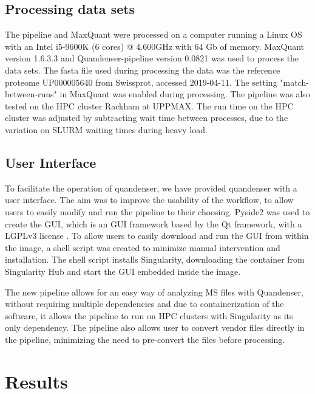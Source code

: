\documentclass[11pt]{article}
\begin{document}
\subsection*{Processing data sets}
The pipeline and MaxQuant were processed on a computer running a Linux OS with an Intel i5-9600K (6 cores) @ 4.600GHz with 64 Gb of memory. MaxQuant version 1.6.3.3 and Quandenser-pipeline version 0.0821 was used to process the data sets. The fasta file used during processing the data was the reference proteome UP000005640 from Swissprot, accessed 2019-04-11. The setting "match-between-runs" in MaxQuant was enabled during processing. The pipeline was also tested on the HPC cluster Rackham at UPPMAX. The run time on the HPC cluster was adjusted by subtracting wait time between processes, due to the variation on SLURM waiting times during heavy load.


\subsection*{User Interface}
To facilitate the operation of quandenser, we have provided quandenser with a user interface. The aim was to improve the usability of the workflow, to allow users to easily modify and run the pipeline to their choosing. Pyside2 was used to create the GUI, which is an GUI framework based by the Qt framework, with a LGPLv3 license \cite{pyside2}. To allow users to easily download and run the GUI from within the image, a shell script was created to minimize manual intervention and installation. The shell script installs Singularity, downloading the container from Singularity Hub and start the GUI embedded inside the image.

The new pipeline allows for an easy way of analyzing MS files with Quandenser, without requiring multiple dependencies and due to containerization of the software, it allows the pipeline to run on HPC clusters with Singularity as its only dependency. The pipeline also allows user to convert vendor files directly in the pipeline, minimizing the need to pre-convert the files before processing.

\section*{Results}
\end{document}
